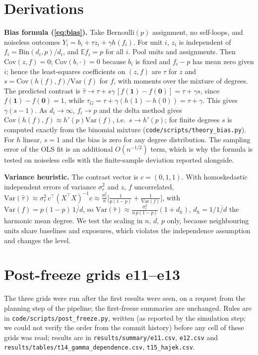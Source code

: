 \section{Derivations}
\label{app:theory}
\textbf{Bias formula (\ref{eq:bias}).} Take Bernoulli$(p)$ assignment, no self-loops, and noiseless outcomes $Y_i=b_i+\tau z_i+\gamma h(f_i)$. For unit $i$, $z_i$ is independent of $f_i=\mathrm{Bin}(d_i,p)/d_i$, and $\mathbb E f_i=p$ for all $i$. Pool units and assignments. Then $\mathrm{Cov}(z,f)=0$; $\mathrm{Cov}(b,\cdot)=0$ because $b_i$ is fixed and $f_i-p$ has mean zero given $i$; hence the least-squares coefficients on $(z,f)$ are $\tau$ for $z$ and $s=\mathrm{Cov}(h(f),f)/\mathrm{Var}(f)$ for $f$, with moments over the mixture of degrees. The predicted contrast is $\hat\tau\to\tau+s\gamma\,[f(\mathbf 1)-f(\mathbf 0)]=\tau+\gamma s$, since $f(\mathbf 1)-f(\mathbf 0)=1$, while $\tau_G=\tau+\gamma(h(1)-h(0))=\tau+\gamma$. This gives $\gamma(s-1)$. As $d_i\to\infty$, $f_i\to p$ and the delta method gives $\mathrm{Cov}(h(f),f)\approx h'(p)\mathrm{Var}(f)$, i.e.\ $s\to h'(p)$; for finite degrees $s$ is computed exactly from the binomial mixture (\texttt{code/scripts/theory\_bias.py}). For $h$ linear, $s=1$ and the bias is zero for any degree distribution. The sampling error of the OLS fit is an additional $O(n^{-1/2})$ term, which is why the formula is tested on noiseless cells with the finite-sample deviation reported alongside.

\textbf{Variance heuristic.} The contrast vector is $c=(0,1,1)$. With homoskedastic independent errors of variance $\sigma_r^2$ and $z$, $f$ uncorrelated, $\mathrm{Var}(\hat\tau)\approx\sigma_r^2\,c^\top(X^\top X)^{-1}c\approx\frac{\sigma_r^2}{n}\big[\frac{1}{p(1-p)}+\frac1{\mathrm{Var}(f)}\big]$, with $\mathrm{Var}(f)=p(1-p)\,\overline{1/d}$, so $\mathrm{Var}(\hat\tau)\approx\frac{\sigma_r^2}{n\,p(1-p)}(1+d_h)$, $d_h=1/\overline{1/d}$ the harmonic mean degree. We test the scaling in $n$, $d$, $p$ only, because neighbouring units share baselines and exposures, which violates the independence assumption and changes the level.

\section{Post-freeze grids e11--e13}
\label{app:post}
The three grids were run after the first results were seen, on a request from the planning step of the pipeline; the first-freeze summaries are unchanged. Rules are in \texttt{code/scripts/post\_freeze.py}, written (as reported by the simulation step; we could not verify the order from the commit history) before any cell of these grids was read; results are in \texttt{results/summary/e11.csv}, \texttt{e12.csv} and \texttt{results/tables/t14\_gamma\_dependence.csv}, \texttt{t15\_hajek.csv}.

